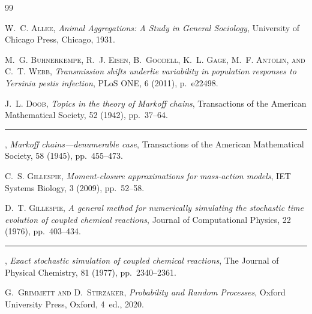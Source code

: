 




















\begin{thebibliography}{99}

\textsc{W.~C. Allee}, \emph{Animal Aggregations: A Study in General
  Sociology}, University of Chicago Press, Chicago, 1931.

\textsc{M.~G. Buhnerkempe, R.~J. Eisen, B.~Goodell, K.~L. Gage,
  M.~F. Antolin, and C.~T. Webb}, \emph{Transmission shifts underlie
  variability in population responses to {Y}ersinia pestis infection},
  PLoS ONE, 6 (2011), p.~e22498.

\textsc{J.~L. Doob}, \emph{Topics in the theory of {M}arkoff chains},
  Transactions of the American Mathematical Society, 52 (1942),
  pp.~37--64.

\leavevmode\rule[0.6ex]{2em}{0.4pt}, \emph{{M}arkoff chains---denumerable
  case}, Transactions of the American Mathematical Society, 58 (1945),
  pp.~455--473.

\textsc{C.~S. Gillespie}, \emph{Moment-closure approximations for
  mass-action models}, IET Systems Biology, 3 (2009), pp.~52--58.

\textsc{D.~T. Gillespie}, \emph{A general method for numerically
  simulating the stochastic time evolution of coupled chemical
  reactions}, Journal of Computational Physics, 22 (1976),
  pp.~403--434.

\leavevmode\rule[0.6ex]{2em}{0.4pt}, \emph{Exact stochastic simulation of
  coupled chemical reactions}, The Journal of Physical Chemistry, 81
  (1977), pp.~2340--2361.

\textsc{G.~Grimmett and D.~Stirzaker}, \emph{Probability and Random
  Processes}, Oxford University Press, Oxford, 4~ed., 2020.


\end{thebibliography}
